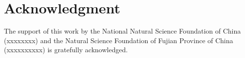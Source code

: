 \documentclass{elsarticle}
\begin{document}


\section*{Acknowledgment}
The support of this work by the National Natural Science Foundation of China (xxxxxxxx) and the Natural Science Foundation of Fujian Province of China (xxxxxxxxxx) is gratefully acknowledged.
\appendix

\end{document}
